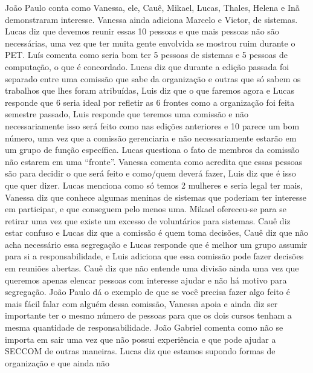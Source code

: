 \documentclass{ata-calico}
\begin{document}
\maketitle


João Paulo conta como Vanessa, ele, Cauê, Mikael, Lucas, Thales, Helena e Inã
demonstraram interesse. Vanessa ainda adiciona Marcelo e Victor, de sistemas.
Lucas diz que devemos reunir essas 10 pessoas e que mais pessoas não são
necessárias, uma vez que ter muita gente envolvida se mostrou ruim durante o
PET\@. Luís comenta como seria bom ter 5 pessoas de sistemas e 5 pessoas de
computação, o que é concordado. Lucas diz que durante a edição passada foi
separado entre uma comissão que sabe da organização e outras que só sabem os
trabalhos que lhes foram atribuídas, Luis diz que o que faremos agora e Lucas
responde que 6 seria ideal por refletir as 6 frontes como a organização foi
feita semestre passado, Luis responde que teremos uma comissão e não
necessariamente isso será feito como nas edições anteriores e 10 parece um bom
número, uma vez que a comissão gerenciaria e não necessariamente estarão em um
grupo de função específica.  Lucas questiona o fato de membros da comissão não
estarem em uma ``fronte''.  Vanessa comenta como acredita que essas pessoas são
para decidir o que será feito e como/quem deverá fazer, Luis diz que é isso que
quer dizer. Lucas menciona como só temos 2 mulheres e seria legal ter mais,
Vanessa diz que conhece algumas meninas de sistemas que poderiam ter interesse
em participar, e que conseguem pelo menos uma. Mikael ofereceu-se para se
retirar uma vez que existe um excesso de voluntários para sistemas. Cauê diz
estar confuso e Lucas diz que a comissão é quem toma decisões, Cauê diz que não
acha necessário essa segregação e Lucas responde que é melhor um grupo assumir
para si a responsabilidade, e Luis adiciona que essa comissão pode fazer
decisões em reuniões abertas. Cauê diz que não entende uma divisão ainda uma
vez que queremos apenas elencar pessoas com interesse ajudar e não há motivo
para segregação. João Paulo dá o exemplo de que se você precisa fazer algo
feito é mais fácil falar com alguém dessa comissão, Vanessa apoia e ainda diz
ser importante ter o mesmo número de pessoas para que os dois cursos tenham a
mesma quantidade de responsabilidade. João Gabriel comenta como não se importa
em sair uma vez que não possui experiência e que pode ajudar a SECCOM de outras
maneiras. Lucas diz que estamos supondo formas de organização e que ainda não
\end{document}
